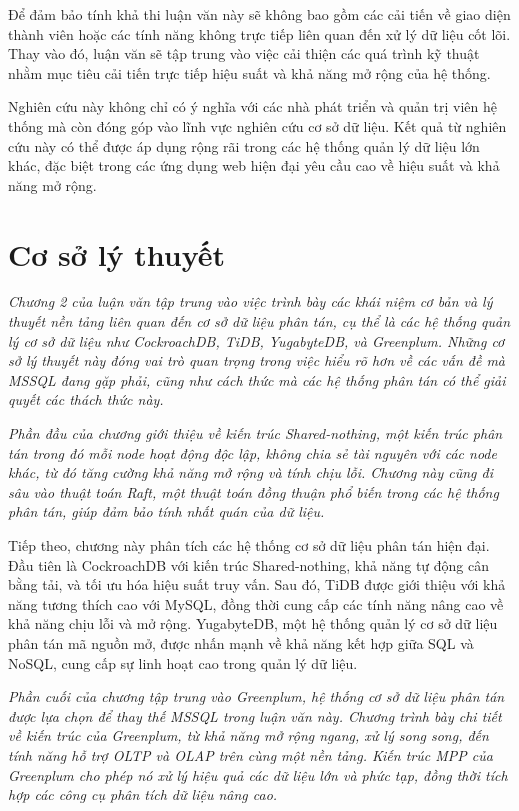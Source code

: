\documentclass{extreport}[13.5pt, oneside,a4paper]
\begin{document}
Để đảm bảo tính khả thi luận văn này sẽ không bao gồm các cải tiến về giao diện thành viên hoặc các tính năng không trực tiếp liên quan đến xử lý dữ liệu cốt lõi. Thay vào đó, luận văn sẽ tập trung vào việc cải thiện các quá trình kỹ thuật nhằm mục tiêu cải tiến trực tiếp hiệu suất và khả năng mở rộng của hệ thống.


Nghiên cứu này không chỉ có ý nghĩa với các nhà phát triển và quản trị viên hệ thống mà còn đóng góp vào lĩnh vực nghiên cứu cơ sở dữ liệu. Kết quả từ nghiên cứu này có thể được áp dụng rộng rãi trong các hệ thống quản lý dữ liệu lớn khác, đặc biệt trong các ứng dụng web hiện đại yêu cầu cao về hiệu suất và khả năng mở rộng.

\section{Cơ sở lý thuyết}


\textit{Chương 2 của luận văn tập trung vào việc trình bày các khái niệm cơ bản và lý thuyết nền tảng liên quan đến cơ sở dữ liệu phân tán, cụ thể là các hệ thống quản lý cơ sở dữ liệu như CockroachDB, TiDB, YugabyteDB, và Greenplum. Những cơ sở lý thuyết này đóng vai trò quan trọng trong việc hiểu rõ hơn về các vấn đề mà MSSQL đang gặp phải, cũng như cách thức mà các hệ thống phân tán có thể giải quyết các thách thức này.}

\textit{Phần đầu của chương giới thiệu về kiến trúc Shared-nothing, một kiến trúc phân tán trong đó mỗi node hoạt động độc lập, không chia sẻ tài nguyên với các node khác, từ đó tăng cường khả năng mở rộng và tính chịu lỗi. Chương này cũng đi sâu vào thuật toán Raft, một thuật toán đồng thuận phổ biến trong các hệ thống phân tán, giúp đảm bảo tính nhất quán của dữ liệu.}

Tiếp theo, chương này phân tích các hệ thống cơ sở dữ liệu phân tán hiện đại. Đầu tiên là CockroachDB với kiến trúc Shared-nothing, khả năng tự động cân bằng tải, và tối ưu hóa hiệu suất truy vấn. Sau đó, TiDB được giới thiệu với khả năng tương thích cao với MySQL, đồng thời cung cấp các tính năng nâng cao về khả năng chịu lỗi và mở rộng. YugabyteDB, một hệ thống quản lý cơ sở dữ liệu phân tán mã nguồn mở, được nhấn mạnh về khả năng kết hợp giữa SQL và NoSQL, cung cấp sự linh hoạt cao trong quản lý dữ liệu.

\textit{Phần cuối của chương tập trung vào Greenplum, hệ thống cơ sở dữ liệu phân tán được lựa chọn để thay thế MSSQL trong luận văn này. Chương trình bày chi tiết về kiến trúc của Greenplum, từ khả năng mở rộng ngang, xử lý song song, đến tính năng hỗ trợ OLTP và OLAP trên cùng một nền tảng. Kiến trúc MPP của Greenplum cho phép nó xử lý hiệu quả các dữ liệu lớn và phức tạp, đồng thời tích hợp các công cụ phân tích dữ liệu nâng cao.}
\end{document}
